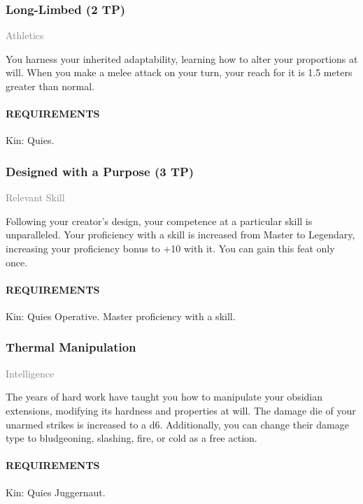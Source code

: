     \subsubsection{Long-Limbed (2 TP)} \label{feat::longlimbed}
    \small{\textcolor{gray}{Athletics}}

    \normalsize
    You harness your inherited adaptability, learning how to alter your proportions at will.
    When you make a melee attack on your turn, your reach for it is 1.5 meters greater than normal.
    \paragraph{REQUIREMENTS} Kin: Quies.

    \subsubsection{Designed with a Purpose (3 TP)} \label{feat::designedwithapurpose}
    \small{\textcolor{gray}{Relevant Skill}}

    \normalsize
    Following your creator's design, your competence at a particular skill is unparalleled.
    Your proficiency with a skill is increased from Master to Legendary, increasing your proficiency bonus to +10 with it.
    You can gain this feat only once.
    \paragraph{REQUIREMENTS} Kin: Quies Operative. Master proficiency with a skill.
    \subsubsection{Thermal Manipulation} \label{feat::thermalmanipulation}
    \small{\textcolor{gray}{Intelligence}}

    \normalsize
    The years of hard work have taught you how to manipulate your obsidian extensions, modifying its hardness and properties at will.
    The damage die of your unarmed strikes is increased to a d6.
    Additionally, you can change their damage type to bludgeoning, slashing, fire, or cold as a free action.
    \paragraph{REQUIREMENTS} Kin: Quies Juggernaut.


